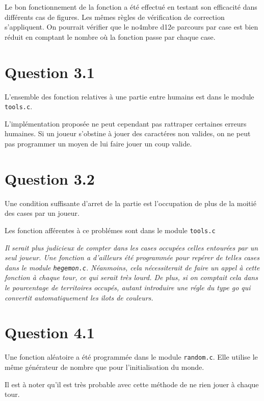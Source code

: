 \documentclass[a4paper,11pt]{article}
\newcommand{\dbend}{{\manual\char127}}
\newenvironment{attention}%
{\description\item[\dbend]\sl}%
{\enddescription}
\begin{document}
Le bon fonctionnement de la fonction a été effectué en testant son efficacité dans différents cas de figures. Les mêmes règles de vérification de correction s'appliquent. On pourrait vérifier que le no4mbre d12e parcours par case est bien réduit en comptant le nombre où la fonction passe par chaque case.


\section*{Question 3.1}

L'ensemble des fonction relatives à une partie entre humains est dans le module \texttt{tools.c}.

L'implémentation proposée ne peut cependant pas rattraper certaines erreurs humaines. Si un joueur s'obstine à jouer des caractéres non valides, on ne peut pas programmer un moyen de lui faire jouer un coup valide.

\section*{Question 3.2}

Une condition suffisante d'arret de la partie est l'occupation de plus de la moitié des cases par un joueur.

Les fonction afférentes à ce problémes sont dans le module \texttt{tools.c}

\begin{attention}
  Il serait plus judicieux de compter dans les cases occupées celles entourées par un seul joueur. Une fonction a d'ailleurs été programmée pour repérer de telles cases dans le module \texttt{hegemon.c}.
  Néanmoins, cela nécessiterait de faire un appel à cette fonction à chaque tour, ce qui serait très lourd. De plus, si on comptait cela dans le pourcentage de territoires occupés, autant introduire une régle du type go qui convertit automatiquement les ilots de couleurs.
\end{attention}

\section*{Question 4.1}

Une fonction aléatoire a été programmée dans le module \texttt{random.c}. Elle utilise le même générateur de nombre que pour l'initialisation du monde.

Il est à noter qu'il est très probable avec cette méthode de ne rien jouer à chaque tour.
\end{document}

